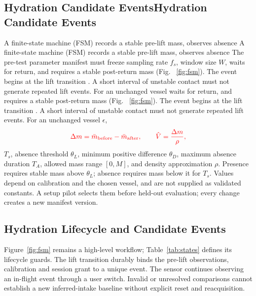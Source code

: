 \documentclass[conference]{IEEEtran}
\providecommand{\DIFadd}[1]{{\protect\color{blue} \sf #1}} %
\providecommand{\DIFdel}[1]{{\protect\color{red} \ifmmode #1\else\scriptsize #1\fi}} %
\providecommand{\DIFaddbegin}{} %
\providecommand{\DIFaddend}{} %
\providecommand{\DIFdelbegin}{} %
\providecommand{\DIFdelend}{} %
\begin{document}
\DIFdelbegin \subsection{\DIFdel{Hydration Candidate Events}}
\addtocounter{subsection}{-1}%
\DIFdel{A finite-state machine (FSM) records a stable pre-lift mass, observes absence }\DIFdelend \DIFaddbegin \DIFadd{The pre-test parameter manifest must freeze sampling rate $f_s$, window size $W$}\DIFaddend , \DIFdelbegin \DIFdel{waits for return, and requires a stable post-return mass (Fig. ~\ref{fig:fsm}). The event begins at the lift transition . A short interval of unstable contact must not generate repeated lift events. For an unchanged vessel }\DIFdelend \DIFaddbegin \DIFadd{$\epsilon$}\DIFaddend , \DIFdelbegin \begin{displaymath}\DIFdel{\Delta m=\bar m_{\rm before}-\bar m_{\rm after},\qquad
\hat V=\frac{\Delta m}{\rho},%
}\end{displaymath}%
\DIFdelend \DIFaddbegin \DIFadd{$T_s$, absence threshold $\theta_L$, minimum positive difference $\theta_D$, maximum absence duration $T_A$, allowed mass range $[0,M]$, and density approximation $\rho$. Presence requires stable mass above $\theta_L$; absence requires mass below it for $T_s$. Values depend on calibration and the chosen vessel, and are not supplied as validated constants. A setup pilot selects them before held-out evaluation; every change creates a new manifest version.
}

\subsection{\DIFadd{Hydration Lifecycle and Candidate Events}}
\DIFadd{Figure~\ref{fig:fsm} remains a high-level workflow; Table~\ref{tab:states} defines its lifecycle guards. The lift transition durably binds the pre-lift observations, calibration and session grant to a unique event. The sensor continues observing an in-flight event through a user switch. Invalid or unresolved comparisons cannot establish a new inferred-intake baseline without explicit reset and reacquisition.
}
\end{document}

